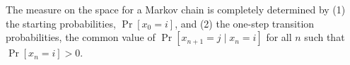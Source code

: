 The measure on the space for a Markov chain is completely determined by
(1) the starting probabilities, $\Pr[x_0 = i]$, and
(2) the one-step transition probabilities, the common value of $\Pr[x_{n+1} = j \mid x_n = i]$ for all $n$ such that $\Pr[x_n = i] > 0$.